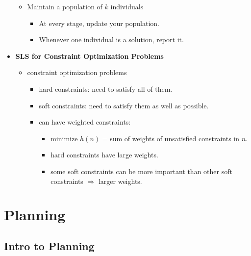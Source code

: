 \documentclass{article}
\begin{document}
\begin{itemize}
        \begin{itemize}
            \item Maintain a population of $k$ individuals
                \begin{itemize}
                    \item At every stage, update your population.
                    \item Whenever one individual is a solution, report it.
                \end{itemize}
        \end{itemize}
    \item \textbf{SLS for Constraint Optimization Problems}
        \begin{itemize}
            \item constraint optimization problems
                \begin{itemize}
                    \item hard constraints: need to satisfy all of them.
                    \item soft constraints: need to satisfy them as well as possible.
                    \item can have weighted constraints:
                        \begin{itemize}
                            \item minimize $h(n)$ = sum of weights of unsatisfied constraints in $n$.
                            \item hard constraints have large weights.
                            \item some soft constraints can be more important than other soft constraints $\Rightarrow$ larger weights.
                        \end{itemize}
                \end{itemize}
        \end{itemize}
\end{itemize}

\section{Planning}

\subsection{Intro to Planning}
\end{document}
